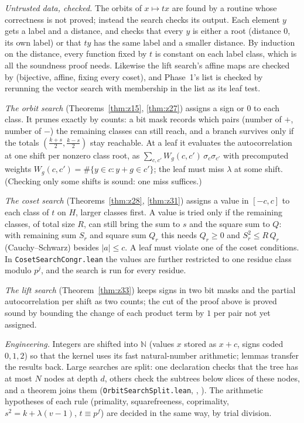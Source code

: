 \emph{Untrusted data, checked.} The orbits of $x \mapsto tx$ are found by a routine whose
correctness is not proved; instead the search checks its output. Each element $y$ gets a label
and a distance, and  checks that every $y$ is either a root
(distance $0$, its own label) or that $ty$ has the same label and a smaller distance. By
induction on the distance, every function fixed by $t$ is constant on each label class, which
is all the soundness proof needs. Likewise the lift search's affine maps are checked by
 (bijective, affine, fixing every coset), and Phase~1's list is checked
by rerunning the vector search with membership in the list as its leaf test.

\emph{The orbit search} (Theorems~\ref{thm:z15}, \ref{thm:z27}) assigns a sign or $0$ to each
class. It prunes exactly by counts: a bit mask records which pairs (number of $+$, number of
$-$) the remaining classes can still reach, and a branch survives only if the totals
$(\tfrac{k+s}{2}, \tfrac{k-s}{2})$ stay reachable. At a leaf it evaluates the autocorrelation at
one shift per nonzero class root, as $\sum_{c, c'} W_g(c, c')\,\sigma_c\sigma_{c'}$ with
precomputed weights $W_g(c, c') = \#\{y \in c : y + g \in c'\}$; the leaf must miss $\lambda$ at
some shift. (Checking only some shifts is sound: one miss suffices.)

\emph{The coset search} (Theorems~\ref{thm:z28}, \ref{thm:z31}) assigns a value in $[-c, c]$
to each class of $t$ on $H$, larger classes first. A value is tried only if the remaining
classes, of total size $R$, can still bring the sum to $s$ and the square sum to $Q$: with
remaining sum $S_r$ and square sum $Q_r$ this needs $Q_r \ge 0$ and $S_r^2 \le R\,Q_r$
(Cauchy--Schwarz) besides $|a| \le c$. A leaf must violate one of the coset conditions. In
\texttt{CosetSearchCongr.lean} the values are further restricted to one residue class modulo
$p^j$, and the search is run for every residue.

\emph{The lift search} (Theorem~\ref{thm:z33}) keeps signs in two bit masks and the partial
autocorrelation per shift as two counts; the cut of the proof above is proved sound by
bounding the change of each product term by $1$ per pair not yet assigned.

\emph{Engineering.} Integers are shifted into $\mathbb{N}$ (values $x$ stored as $x + c$, signs
coded $0, 1, 2$) so that the kernel uses its fast natural-number arithmetic; lemmas transfer the
results back. Large searches are split: one declaration checks that the tree has at most $N$
nodes at depth $d$, others check the subtrees below slices of these nodes, and a theorem joins
them (\texttt{OrbitSearchSplit.lean}, ,
). The arithmetic hypotheses of each rule (primality,
squarefreeness, coprimality, $s^2 = k + \lambda(v-1)$, $t \equiv p^f$) are decided in the same
way, by trial division.

